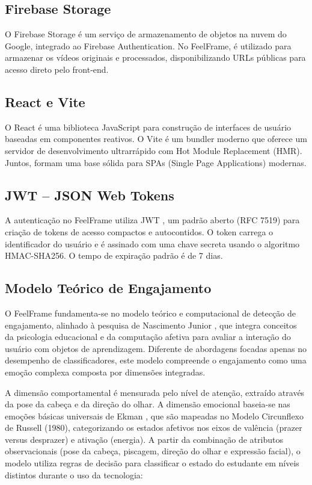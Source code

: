 \documentclass[
	12pt,
	openright,
	oneside,
	a4paper,
	english,
	brazil
	]{abntex2}
\begin{document}
\subsection{Firebase Storage}

O Firebase Storage \cite{firebase2023} é um serviço de armazenamento de objetos na nuvem do Google, integrado ao Firebase Authentication. No FeelFrame, é utilizado para armazenar os vídeos originais e processados, disponibilizando URLs públicas para acesso direto pelo front-end.

\subsection{React e Vite}

O React \cite{react2023} é uma biblioteca JavaScript para construção de interfaces de usuário baseadas em componentes reativos. O Vite \cite{vite2023} é um bundler moderno que oferece um servidor de desenvolvimento ultrarrápido com Hot Module Replacement (HMR). Juntos, formam uma base sólida para SPAs (Single Page Applications) modernas.

\subsection{JWT -- JSON Web Tokens}

A autenticação no FeelFrame utiliza JWT \cite{jones2015json}, um padrão aberto (RFC 7519) para criação de tokens de acesso compactos e autocontidos. O token carrega o identificador do usuário e é assinado com uma chave secreta usando o algoritmo HMAC-SHA256. O tempo de expiração padrão é de 7 dias.

\subsection{Modelo Teórico de Engajamento}
\label{sec:modelo_engajamento}

O FeelFrame fundamenta-se no modelo teórico e computacional de detecção de engajamento, alinhado à pesquisa de Nascimento Junior \cite{nascimento2024nelson}, que integra conceitos da psicologia educacional e da computação afetiva para avaliar a interação do usuário com objetos de aprendizagem. Diferente de abordagens focadas apenas no desempenho de classificadores, este modelo compreende o engajamento como uma emoção complexa composta por dimensões integradas.

A dimensão comportamental é mensurada pelo nível de atenção, extraído através da pose da cabeça e da direção do olhar. A dimensão emocional baseia-se nas emoções básicas universais de Ekman \cite{ekman1971constants}, que são mapeadas no Modelo Circunflexo de Russell (1980), categorizando os estados afetivos nos eixos de valência (prazer versus desprazer) e ativação (energia). A partir da combinação de atributos observacionais (pose da cabeça, piscagem, direção do olhar e expressão facial), o modelo utiliza regras de decisão para classificar o estado do estudante em níveis distintos durante o uso da tecnologia:
\end{document}

